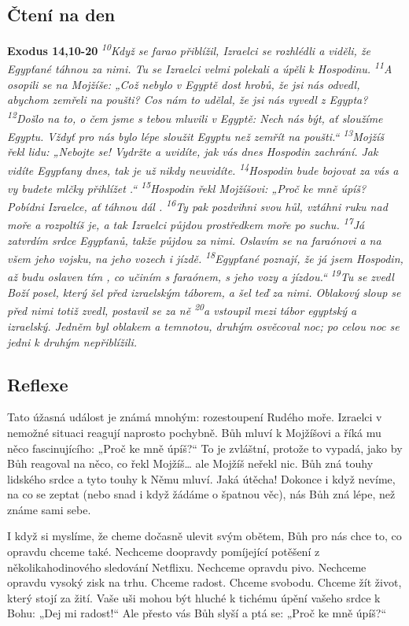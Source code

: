 \documentclass[11pt]{article}
\begin{document}
\subsection*{Čtení na den}
\textbf{Exodus 14,10-20}
\newline
\textit{
\textsuperscript{10}Když se farao přiblížil, Izraelci se rozhlédli a viděli, že Egypťané táhnou za nimi. Tu se Izraelci velmi polekali a úpěli k Hospodinu.
\textsuperscript{11}A osopili se na Mojžíše: „Což nebylo v Egyptě dost hrobů, že jsi nás odvedl, abychom zemřeli na poušti? Cos nám to udělal, že jsi nás vyvedl z Egypta?
\textsuperscript{12}Došlo na to, o čem jsme s tebou mluvili v Egyptě: Nech nás být, ať sloužíme Egyptu. Vždyť pro nás bylo lépe sloužit Egyptu než zemřít na poušti.“
\textsuperscript{13}Mojžíš řekl lidu: „Nebojte se! Vydržte a uvidíte, jak vás dnes Hospodin zachrání. Jak vidíte Egypťany dnes, tak je už nikdy neuvidíte.
\textsuperscript{14}Hospodin bude bojovat za vás a vy budete mlčky přihlížet .“
\textsuperscript{15}Hospodin řekl Mojžíšovi: „Proč ke mně úpíš? Pobídni Izraelce, ať táhnou dál .
\textsuperscript{16}Ty pak pozdvihni svou hůl, vztáhni ruku nad moře a rozpoltíš je, a tak Izraelci půjdou prostředkem moře po suchu.
\textsuperscript{17}Já zatvrdím srdce Egypťanů, takže půjdou za nimi. Oslavím se na faraónovi a na všem jeho vojsku, na jeho vozech i jízdě.
\textsuperscript{18}Egypťané poznají, že já jsem Hospodin, až budu oslaven tím , co učiním s faraónem, s jeho vozy a jízdou.“
\textsuperscript{19}Tu se zvedl Boží posel, který šel před izraelským táborem, a šel teď za nimi. Oblakový sloup se před nimi totiž zvedl, postavil se za ně
\textsuperscript{20}a vstoupil mezi tábor egyptský a izraelský. Jedněm byl oblakem a temnotou, druhým osvěcoval noc; po celou noc se jedni k druhým nepřiblížili.
}

\subsection*{Reflexe}
Tato úžasná událost je známá mnohým: rozestoupení Rudého moře. Izraelci v nemožné situaci reagují naprosto
pochybně. Bůh mluví k Mojžíšovi a říká mu něco fascinujícího: „Proč ke mně úpíš?“ To je zvláštní, protože to vypadá,
jako by Bůh reagoval na něco, co řekl Mojžíš… ale Mojžíš neřekl nic. Bůh zná touhy lidského srdce a tyto touhy
k Němu mluví. Jaká útěcha! Dokonce i když nevíme, na co se zeptat (nebo snad i když žádáme o špatnou věc), nás Bůh
zná lépe, než známe sami sebe.

I když si myslíme, že cheme dočasně ulevit svým obětem, Bůh pro nás chce to, co opravdu chceme také. Nechceme
doopravdy pomíjející potěšení z několikahodinového sledování Netflixu. Nechceme opravdu pivo. Nechceme opravdu
vysoký zisk na trhu. Chceme radost. Chceme svobodu. Chceme žít život, který stojí za žití. Vaše uši mohou být hluché
k tichému úpění vašeho srdce k Bohu: „Dej mi radost!“ Ale přesto vás Bůh slyší a ptá se: „Proč ke mně úpíš?“
\end{document}
